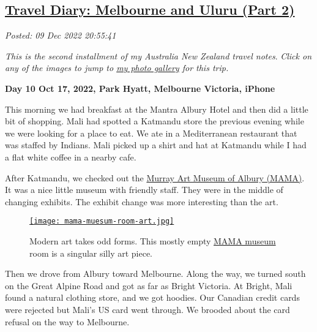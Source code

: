 %

\subsection*{\href{https://analyzethedatanotthedrivel.org/2022/12/09/travel-diary-melbourne-and-uluru-part-2/}{Travel Diary: Melbourne and Uluru (Part 2)}}


\noindent\emph{Posted: 09 Dec 2022 20:55:41}
\vspace{6pt}

\emph{This is the second installment of my Australia New Zealand travel
notes}. \emph{Click on any of the images to jump to
\href{https://conceptcontrol.smugmug.com/Trips/Overseas/Australia-New-Zealand-2022/}{my
photo gallery} for this trip.}


\textbf{Day 10 Oct 17, 2022, Park Hyatt, Melbourne Victoria, iPhone}

This morning we had breakfast at the Mantra Albury Hotel and then did a
little bit of shopping. Mali had spotted a Katmandu store the previous
evening while we were looking for a place to eat. We ate in a Mediterranean 
restaurant that was staffed by Indians. Mali picked up a
shirt and hat at Katmandu while I had a flat white coffee in a nearby
cafe.

After Katmandu, we checked out the
\href{https://www.mamalbury.com.au/}{Murray Art Museum of Albury
(MAMA)}. It was a nice little museum with friendly staff. They were in
the middle of changing exhibits. The exhibit change was more interesting
than the art.

\captionsetup[figure]{labelformat=empty}
\begin{SCfigure}
\centering
\href{https://conceptcontrol.smugmug.com/Trips/Overseas/Australia-New-Zealand-2022/i-Z5hXNjd/A}{\texttt{[image: mama-muesum-room-art.jpg]}}
\caption[MAMA Art museum room]{Modern art takes odd forms. This mostly empty \href{https://www.mamalbury.com.au/}{MAMA museum} room
is a singular silly art piece.}
\label{fig:7573x0}
\end{SCfigure}

Then we drove from Albury toward Melbourne. Along the way, we turned
south on the Great Alpine Road and got as far as Bright Victoria. At
Bright, Mali found a natural clothing store, and we got hoodies. Our
Canadian credit cards were rejected but Mali's US card went through. We
brooded about the card refusal on the way to Melbourne.

